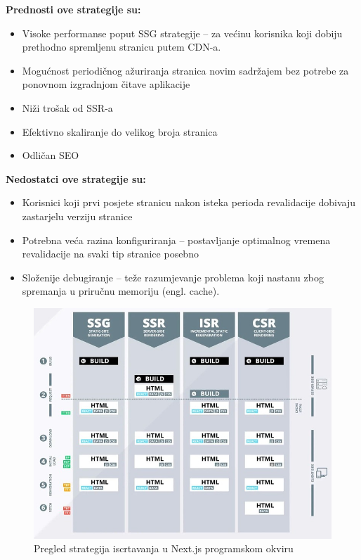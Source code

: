 \bigskip

\textbf{Prednosti ove strategije su:}
\begin{itemize}
    \item Visoke performanse poput SSG strategije – za većinu korisnika koji dobiju prethodno spremljenu stranicu putem CDN-a.
    \item Mogućnost periodičnog ažuriranja stranica novim sadržajem bez potrebe za ponovnom izgradnjom čitave aplikacije
    \item Niži trošak od SSR-a
    \item Efektivno skaliranje do velikog broja stranica
    \item Odličan SEO
\end{itemize}

\bigskip

\textbf{Nedostatci ove strategije su:}

\begin{itemize}
    \item Korisnici koji prvi posjete stranicu nakon isteka perioda revalidacije dobivaju zastarjelu verziju stranice
    \item Potrebna veća razina konfiguriranja – postavljanje optimalnog vremena revalidacije na svaki tip stranice posebno
    \item Složenije debugiranje – teže razumjevanje problema koji nastanu zbog spremanja u priručnu memoriju (engl. cache). \cite{flaws2021isr}
\end{itemize}


\begin{figure}[H]
    \centering
    \includegraphics[width=\textwidth]{slike/pregled-strategija-iscrtavanja.jpg}
    \caption{Pregled strategija iscrtavanja u Next.js programskom okviru\cite{dumais2021nextjs}}
    \label{fig:pregled-strategija-iscrtavanja}
\end{figure}

